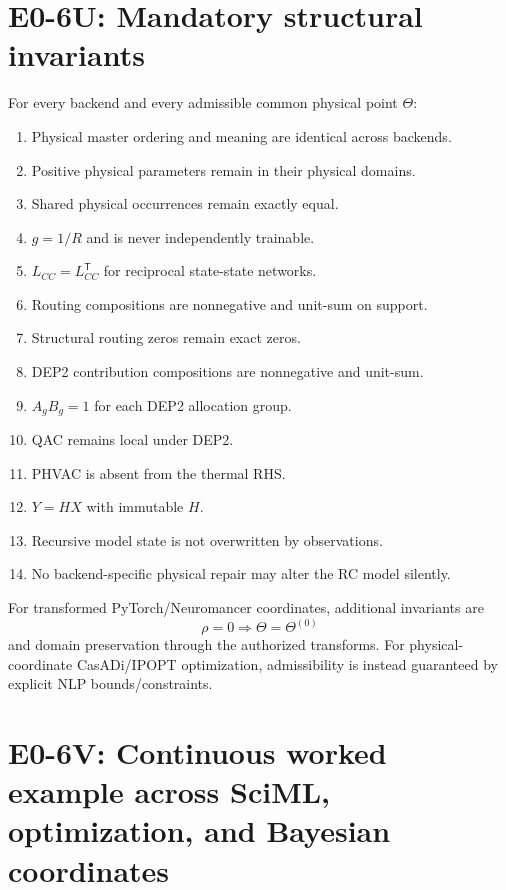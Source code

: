 \documentclass[11pt]{article}
\begin{document}
\section{E0-6U: Mandatory structural invariants}

For every backend and every admissible common physical point $\Theta$:
\begin{enumerate}[leftmargin=*]
\item Physical master ordering and meaning are identical across backends.
\item Positive physical parameters remain in their physical domains.
\item Shared physical occurrences remain exactly equal.
\item $g=1/R$ and is never independently trainable.
\item $L_{CC}=L_{CC}^{\mathsf T}$ for reciprocal state-state networks.
\item Routing compositions are nonnegative and unit-sum on support.
\item Structural routing zeros remain exact zeros.
\item DEP2 contribution compositions are nonnegative and unit-sum.
\item $A_gB_g=1$ for each DEP2 allocation group.
\item QAC remains local under DEP2.
\item PHVAC is absent from the thermal RHS.
\item $Y=HX$ with immutable $H$.
\item Recursive model state is not overwritten by observations.
\item No backend-specific physical repair may alter the RC model silently.
\end{enumerate}
For transformed PyTorch/Neuromancer coordinates, additional invariants are
\[
\boxed{\rho=0\Rightarrow\Theta=\Theta^{(0)}}
\]
and domain preservation through the authorized transforms. For physical-
coordinate CasADi/IPOPT optimization, admissibility is instead guaranteed by
explicit NLP bounds/constraints.

\section{E0-6V: Continuous worked example across SciML, optimization, and Bayesian coordinates}
\end{document}
